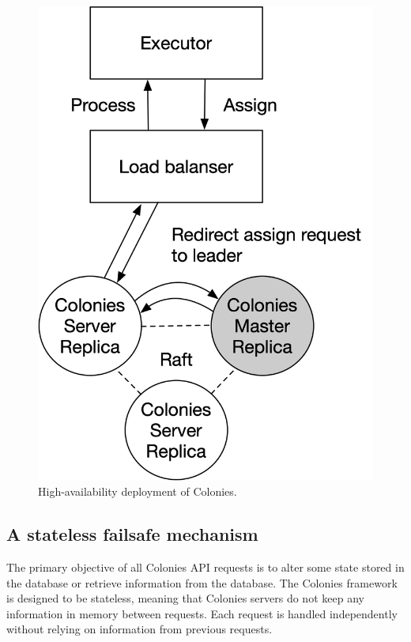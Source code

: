 \documentclass{article}
\begin{document}
\begin{figure}[h]
	\centering
    \includegraphics[scale=0.5]{raft.png}
	\caption{High-availability deployment of Colonies.}
	\label{fig:ha_deployment}
\end{figure}

\subsection{A stateless failsafe mechanism}
\label{stateless_error_management}
The primary objective of all Colonies API requests is to alter some state stored in the database or retrieve information from the database. The Colonies framework is designed to be stateless, meaning that Colonies servers do not keep any information in memory between requests. Each request is handled independently without relying on information from previous requests. 
\end{document}
